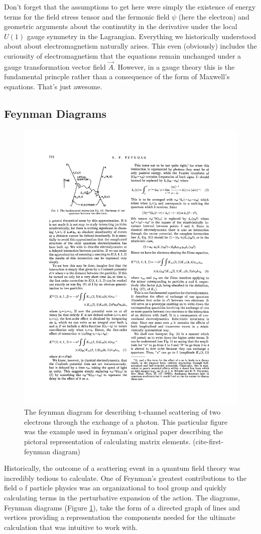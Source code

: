 Don't forget that the assumptions to get here were simply the existence of energy terms for the field stress tensor 
and the fermonic field $\psi$ (here the electron) and geometric arguments about the continutity in the derivative 
under the local $U(1)$ gauge symmetry in the Lagrangian. Everything we historically understood
about about electromagnetism naturally arises. This even (obviously) includes the curiousity of electromagnetism that
the equations remain unchanged under a gauge transformation vector field $\vec A$. However, in a gauge theory 
this is the fundamental princple rather than a consequence of the form of Maxwell's equations. 
That's just awesome. 

\subsection{Feynman Diagrams}

\begin{figure}
\begin{center}
\includegraphics[width=.450\textwidth]{pics/first_diagram}
\end{center}
\caption{The feynman diagram for describing t-channel scattering of two electrons through
the exchange of a photon. This particular figure was the example used in feynman's original paper describing the pictoral representation
of calculating matrix elements. (cite-first-feynman diagram)}
\label{fig:first_diagram}
\end{figure}

Historically, the outcome of a scattering event in a quantum field theory was
 incredibly tedious to calculate. One of Feynman's greatest contributions to the field o
f particle physics was an organizational to tool group and quickly calculating terms 
in the perturbative expansion of the action. The diagrams, Feynman diagrams (Figure \ref{fig:first_diagram}), 
take the form of a directed graph of lines and vertices providing a  representation
the components needed for the ultimate calculation that was intuitive to work with. 

